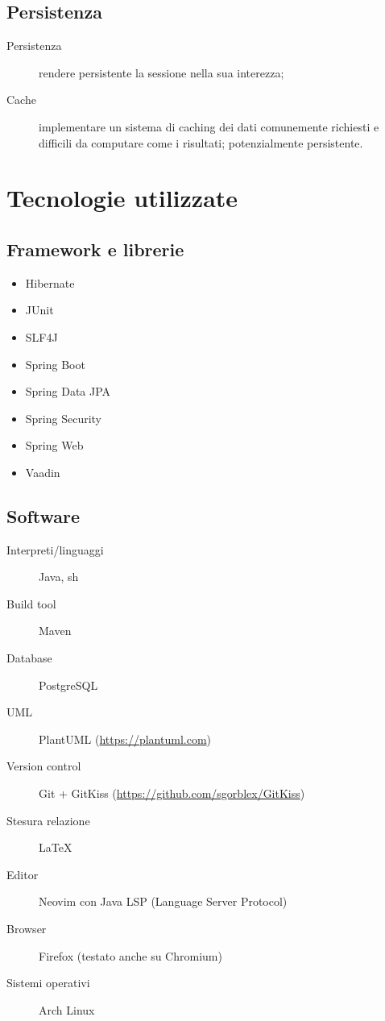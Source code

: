 \subsection{Persistenza}
\begin{description}
	\item[Persistenza] rendere persistente la sessione nella sua interezza;
	\item[Cache] implementare un sistema di caching dei dati comunemente richiesti e difficili da computare come i risultati; potenzialmente persistente.
\end{description}




\section{Tecnologie utilizzate}


\subsection{Framework e librerie}
\begin{itemize}
	\item Hibernate
	\item JUnit
	\item SLF4J
	\item Spring Boot
	\item Spring Data JPA
	\item Spring Security
	\item Spring Web
	\item Vaadin
\end{itemize}


\subsection{Software}
\begin{description}
	\item[Interpreti/linguaggi] Java, sh
	\item[Build tool] Maven
	\item[Database] PostgreSQL
	\item[UML] PlantUML (\url{https://plantuml.com})
	\item[Version control] Git + GitKiss (\url{https://github.com/sgorblex/GitKiss})
	\item[Stesura relazione] \LaTeX
	\item[Editor] Neovim con Java LSP (Language Server Protocol)
	\item[Browser] Firefox (testato anche su Chromium)
	\item[Sistemi operativi] Arch Linux
\end{description}

